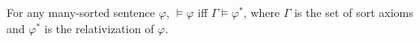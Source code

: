 For any many-sorted sentence $\varphi$, $\models \varphi$ iff $\Gamma \models \varphi^*$, where $\Gamma$ is the set of sort axioms and $\varphi^*$ is the relativization of $\varphi$.
